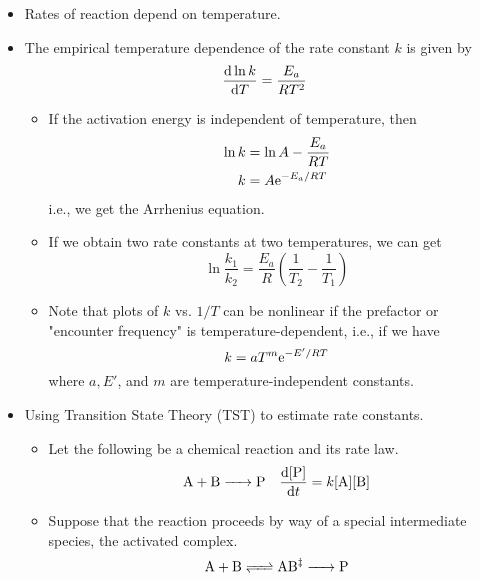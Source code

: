\documentclass[../notes.tex]{subfiles}
\begin{document}
\begin{itemize}
\begin{itemize}
\begin{itemize}
        \end{itemize}
    \end{itemize}
    \item Rates of reaction depend on temperature.
    \item The empirical temperature dependence of the rate constant $k$ is given by
    \begin{equation*}
        \dv{\ln k}{T} = \frac{E_a}{RT^2}
    \end{equation*}
    \begin{itemize}
        \item If the activation energy is independent of temperature, then
        \begin{align*}
            \ln k &= \ln A-\frac{E_a}{RT}\\
            k &= A\e[-E_a/RT]
        \end{align*}
        i.e., we get the Arrhenius equation.
        \item If we obtain two rate constants at two temperatures, we can get
        \begin{equation*}
            \ln\frac{k_1}{k_2} = \frac{E_a}{R}\left( \frac{1}{T_2}-\frac{1}{T_1} \right)
        \end{equation*}
        \item Note that plots of $k$ vs. $1/T$ can be nonlinear if the prefactor or "encounter frequency" is temperature-dependent, i.e., if we have
        \begin{equation*}
            k = aT^m\e[-E'/RT]
        \end{equation*}
        where $a, E'$, and $m$ are temperature-independent constants.
    \end{itemize}
    \item Using Transition State Theory (TST) to estimate rate constants.
    \begin{itemize}
        \item Let the following be a chemical reaction and its rate law.
        \begin{align*}
            \ce{A + B} &\ce{->} \ce{P}&
            \dv{[\ce{P}]}{t} = k[\ce{A}][\ce{B}]
        \end{align*}
        \item Suppose that the reaction proceeds by way of a special intermediate species, the activated complex.
        \begin{equation*}
            \ce{A + B <=> AB${}^\ddagger$ -> P}
        \end{equation*}

\end{itemize}
\end{itemize}
\end{document}
